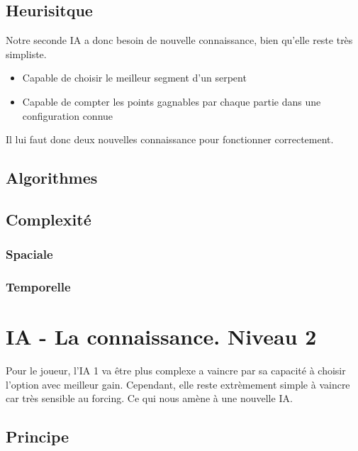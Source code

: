 \documentclass[a4paper,12pt]{report}
\begin{document}
\subsection{Heurisitque}

Notre seconde IA a donc besoin de nouvelle connaissance, bien qu'elle reste tr\`es simpliste.

\begin{itemize}
 \item Capable de choisir le meilleur segment d'un serpent
 \item Capable de compter les points gagnables par chaque partie dans une configuration connue
\end{itemize}

Il lui faut donc deux nouvelles connaissance pour fonctionner correctement.

\subsection{Algorithmes}



\subsection{Complexit\'e}

\subsubsection{Spaciale}

\subsubsection{Temporelle}

\section{IA - La connaissance. Niveau 2}

Pour le joueur, l'IA 1 va \^etre plus complexe a vaincre par sa capacit\'e \`a choisir l'option avec meilleur gain. Cependant, elle reste extr\`emement simple \`a vaincre car tr\`es sensible au forcing. Ce qui nous am\`ene \`a une nouvelle IA. 

\subsection{Principe}
\end{document}
